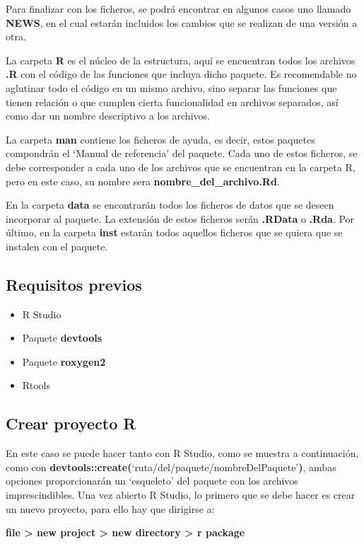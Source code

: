 Para finalizar con los ficheros, se podr\'a encontrar en algunos casos uno llamado \textbf{NEWS}, en el cual estar\'an 
incluidos los cambios que se realizan de una versi\'on a otra.

La carpeta \textbf{R} es el n\'ucleo de la estructura, aqu\'i se encuentran todos los archivos \textbf{\textbf{.R}} con el c\'odigo de las funciones que incluya dicho paquete.
Es recomendable no aglutinar todo el c\'odigo en un mismo archivo, sino separar las funciones que tienen relaci\'on 
o que cumplen cierta funcionalidad en archivos separados, as\'i como dar un nombre descriptivo a los archivos.

La carpeta \textbf{man} contiene los ficheros de ayuda, es decir, estos paquetes compondr\'an el \enquote*{Manual de referencia} 
del paquete. Cada uno de estos ficheros, se debe corresponder a cada uno de los archivos que se encuentran 
en la carpeta R, pero en este caso, su nombre sera \textbf{nombre\_del\_archivo\textbf{.R}d}.

En la carpeta \textbf{data} se encontrar\'an todos los ficheros de datos que se deseen incorporar al paquete. La extensi\'on 
de estos ficheros ser\'an \textbf{\textbf{.R}Data} o \textbf{\textbf{.R}da}.
Por \'ultimo, en la carpeta \textbf{inst} estar\'an todos aquellos ficheros que se quiera que se instalen con el paquete.
\subsection{Requisitos previos}

\begin{itemize}
    \item R Studio
    \item Paquete \textbf{devtools}
    \item Paquete \textbf{\textbf{roxygen2}} 
    \item Rtools
\end{itemize}

\subsection{Crear proyecto R}

En este caso se puede hacer tanto con R Studio, como se muestra a continuaci\'on,
como con \textbf{devtools::create(}\enquote*{ruta/del/paquete/nombreDelPaquete}\textbf{)}, ambas opciones
proporcionar\'an un \enquote*{esqueleto} del paquete con los archivos imprescindibles.
Una vez abierto R Studio, lo primero que se debe hacer es crear un nuevo proyecto, para ello hay que dirigirse a: 
\begin{center}
    \textbf{file > new project > new directory > r package} 
\end{center}


